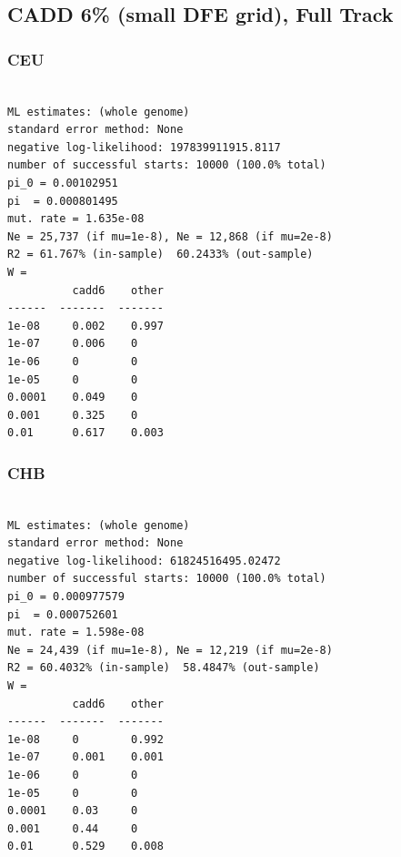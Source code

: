 \documentclass[11pt]{article}
\begin{document}
\subsection{CADD 6\% (small DFE grid), Full Track}
\subsubsection*{CEU}
\begin{minipage}{\linewidth}\begin{footnotesize}
\begin{verbatim}

ML estimates: (whole genome)
standard error method: None
negative log-likelihood: 197839911915.8117
number of successful starts: 10000 (100.0% total)
pi_0 = 0.00102951
pi  = 0.000801495
mut. rate = 1.635e-08 
Ne = 25,737 (if mu=1e-8), Ne = 12,868 (if mu=2e-8)
R2 = 61.767% (in-sample)  60.2433% (out-sample)
W = 
          cadd6    other
------  -------  -------
1e-08     0.002    0.997
1e-07     0.006    0
1e-06     0        0
1e-05     0        0
0.0001    0.049    0
0.001     0.325    0
0.01      0.617    0.003
\end{verbatim}
\end{footnotesize}\end{minipage}


\subsubsection*{CHB}
\begin{minipage}{\linewidth}\begin{footnotesize}
\begin{verbatim}

ML estimates: (whole genome)
standard error method: None
negative log-likelihood: 61824516495.02472
number of successful starts: 10000 (100.0% total)
pi_0 = 0.000977579
pi  = 0.000752601
mut. rate = 1.598e-08 
Ne = 24,439 (if mu=1e-8), Ne = 12,219 (if mu=2e-8)
R2 = 60.4032% (in-sample)  58.4847% (out-sample)
W = 
          cadd6    other
------  -------  -------
1e-08     0        0.992
1e-07     0.001    0.001
1e-06     0        0
1e-05     0        0
0.0001    0.03     0
0.001     0.44     0
0.01      0.529    0.008
\end{verbatim}
\end{footnotesize}\end{minipage}
\end{document}
